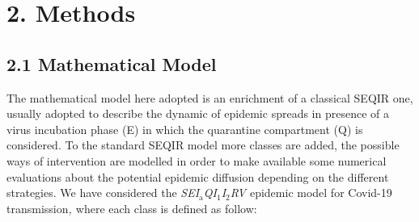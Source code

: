 \documentclass[a4paper]{article}
\providecommand\textsubscript[1]{\ensuremath{{}_{\text{#1}}}}
\begin{document}
\section{2. Methods}
\hypertarget{Toc66707023}{}\subsection{2.1 Mathematical Model }
\hypertarget{Toc66707024}{}\textcolor[rgb]{0.07450981,0.078431375,0.07450981}{The mathematical model here adopted is an
enrichment of a classical SEQIR one, usually adopted to describe the dynamic of epidemic spreads in presence of a virus
incubation phase (E) in which the quarantine compartment (Q) is considered. To the standard SEQIR model more classes
are added, the possible ways of intervention are modelled in order to make available some numerical evaluations about
the potential epidemic diffusion depending on the different strategies. We have considered the
}\textit{\textcolor[rgb]{0.07450981,0.078431375,0.07450981}{SEI}}\textit{\textcolor[rgb]{0.07450981,0.078431375,0.07450981}{\textsubscript{a}}}\textit{\textcolor[rgb]{0.07450981,0.078431375,0.07450981}{QI}}\textit{\textcolor[rgb]{0.07450981,0.078431375,0.07450981}{\textsubscript{1}}}\textit{\textcolor[rgb]{0.07450981,0.078431375,0.07450981}{I}}\textit{\textcolor[rgb]{0.07450981,0.078431375,0.07450981}{\textsubscript{2}}}\textit{\textcolor[rgb]{0.07450981,0.078431375,0.07450981}{RV
}}\textcolor[rgb]{0.07450981,0.078431375,0.07450981}{epidemic model for Covid-19
transmission}\textit{\textcolor[rgb]{0.07450981,0.078431375,0.07450981}{,
}}\textcolor[rgb]{0.07450981,0.078431375,0.07450981}{where each class is defined as follow:}
\end{document}
